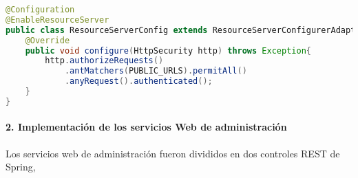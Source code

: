 \begin{enumerate}
\begin{lstlisting}[language=Java, caption={Clase de configuración de servidor de recursos.}, captionpos=b, label={lst:enable-resource-server}]
@Configuration
@EnableResourceServer
public class ResourceServerConfig extends ResourceServerConfigurerAdapter{
	@Override
	public void configure(HttpSecurity http) throws Exception{
		http.authorizeRequests()
			.antMatchers(PUBLIC_URLS).permitAll()
			.anyRequest().authenticated();
	}
}
\end{lstlisting}
\end{enumerate}

\paragraph{2. Implementación de los servicios Web de administración\\}
Los servicios web de administración fueron divididos en dos controles REST de Spring, 
